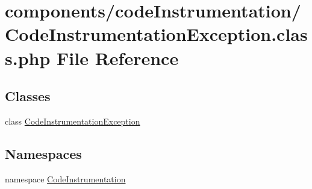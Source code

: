 \hypertarget{_code_instrumentation_exception_8class_8php}{
\section{components/codeInstrumentation/CodeInstrumentationException.class.php File Reference}
\label{_code_instrumentation_exception_8class_8php}
}
\subsection*{Classes}
\begin{CompactItemize}
\item 
class \hyperlink{class_code_instrumentation_exception}{CodeInstrumentationException}
\end{CompactItemize}
\subsection*{Namespaces}
\begin{CompactItemize}
\item 
namespace \hyperlink{namespace_code_instrumentation}{CodeInstrumentation}
\end{CompactItemize}
